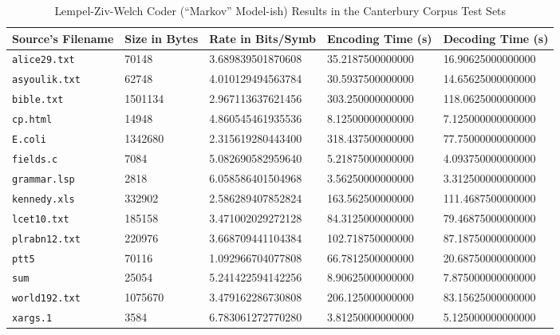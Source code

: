 \documentclass[a4paper, twocolumn]{article}
\begin{document}
    \begin{table*}[t]
        \centering
        \begin{tabular}{lllll}
        \toprule
            Source's Filename & Size in Bytes & Rate in Bits/Symb & Encoding Time (s) & Decoding Time (s) \\
        \midrule
            \texttt{alice29.txt}  &   70148 & 3.689839501870608 & 35.2187500000000 & 16.90625000000000 \\
            \texttt{asyoulik.txt} &   62748 & 4.010129494563784 & 30.5937500000000 & 14.65625000000000 \\
            \texttt{bible.txt}    & 1501134 & 2.967113637621456 & 303.250000000000 & 118.0625000000000 \\
            \texttt{cp.html}      &   14948 & 4.860545461935536 & 8.12500000000000 & 7.125000000000000 \\
            \texttt{E.coli}       & 1342680 & 2.315619280443400 & 318.437500000000 & 77.75000000000000 \\
            \texttt{fields.c}     &    7084 & 5.082690582959640 & 5.21875000000000 & 4.093750000000000 \\
            \texttt{grammar.lsp}  &    2818 & 6.058586401504968 & 3.56250000000000 & 3.312500000000000 \\
            \texttt{kennedy.xls}  &  332902 & 2.586289407852824 & 163.562500000000 & 111.4687500000000 \\
            \texttt{lcet10.txt}   &  185158 & 3.471002029272128 & 84.3125000000000 & 79.46875000000000 \\
            \texttt{plrabn12.txt} &  220976 & 3.668709441104384 & 102.718750000000 & 87.18750000000000 \\
            \texttt{ptt5}         &   70116 & 1.092966704077808 & 66.7812500000000 & 20.68750000000000 \\
            \texttt{sum}          &   25054 & 5.241422594142256 & 8.90625000000000 & 7.875000000000000 \\
            \texttt{world192.txt} & 1075670 & 3.479162286730808 & 206.125000000000 & 83.15625000000000 \\
            \texttt{xargs.1}      &    3584 & 6.783061272770280 & 3.81250000000000 & 5.125000000000000 \\
        \bottomrule
        \end{tabular}
        \caption{Lempel-Ziv-Welch Coder (``Markov'' Model-ish) Results in the Canterbury Corpus Test Sets}
        \label{tab:lzw}
    \end{table*}
\end{document}
